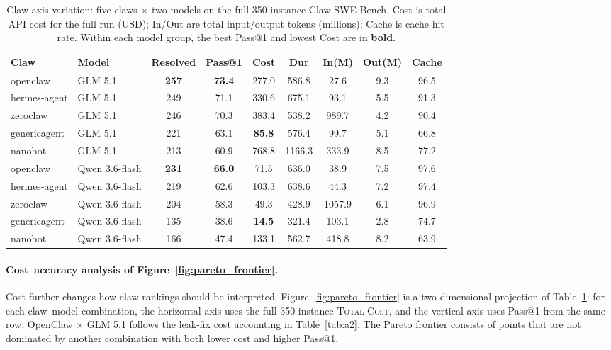 \begin{table}[t]
  \centering
  \scriptsize
  \renewcommand{\arraystretch}{1}
  \setlength{\tabcolsep}{3.0pt}
  \caption{Claw-axis variation: five claws $\times$ two models on the full 350-instance Claw-SWE-Bench. Cost is total API cost for the full run (USD); In/Out are total input/output tokens (millions); Cache is cache hit rate. Within each model group, the best Pass@1 and lowest Cost are in \textbf{bold}.}
  \label{tab:b}
  \begin{tabular*}{0.95\linewidth}{@{\extracolsep{\fill}}ll|ccccccc@{}}
    \toprule
    \textbf{Claw} & \textbf{Model} & \textbf{Resolved} & \textbf{Pass@1} & \textbf{Cost} & \textbf{Dur} & \textbf{In(M)} & \textbf{Out(M)} & \textbf{Cache} \\
    \midrule
    openclaw     & GLM 5.1        & \textbf{257} & \textbf{73.4} & 277.0 & 586.8 & 27.6 & 9.3 & 96.5 \\
    hermes-agent & GLM 5.1        & 249 & 71.1 & 330.6 & 675.1 & 93.1 & 5.5 & 91.3 \\
    zeroclaw     & GLM 5.1        & 246 & 70.3 & 383.4 & 538.2 & 989.7 & 4.2 & 90.4 \\
    genericagent      & GLM 5.1        & 221 & 63.1 & \textbf{85.8} & 576.4 & 99.7 & 5.1 & 66.8 \\
    nanobot      & GLM 5.1        & 213 & 60.9 & 768.8 & 1166.3 & 333.9 & 8.5 & 77.2 \\
    \midrule
    openclaw     & Qwen 3.6-flash & \textbf{231} & \textbf{66.0} & 71.5 & 636.0 & 38.9 & 7.5 & 97.6 \\
    hermes-agent & Qwen 3.6-flash & 219 & 62.6 & 103.3 & 638.6 & 44.3 & 7.2 & 97.4 \\
    zeroclaw     & Qwen 3.6-flash & 204 & 58.3 & 49.3 & 428.9 & 1057.9 & 6.1 & 96.9 \\
    genericagent      & Qwen 3.6-flash & 135 & 38.6 & \textbf{14.5} & 321.4 & 103.1 & 2.8 & 74.7 \\
    nanobot      & Qwen 3.6-flash & 166 & 47.4 & 133.1 & 562.7 & 418.8 & 8.2 & 63.9 \\
    
    \bottomrule
  \end{tabular*}
\end{table}

\paragraph{Cost--accuracy analysis of Figure~\ref{fig:pareto_frontier}.}
Cost further changes how claw rankings should be interpreted. Figure~\ref{fig:pareto_frontier} is a two-dimensional projection of Table~\ref{tab:b}: for each claw--model combination, the horizontal axis uses the full 350-instance \textsc{Total Cost}, and the vertical axis uses Pass@1 from the same row; OpenClaw $\times$ GLM 5.1 follows the leak-fix cost accounting in Table~\ref{tab:a2}. The Pareto frontier consists of points that are not dominated by another combination with both lower cost and higher Pass@1.


